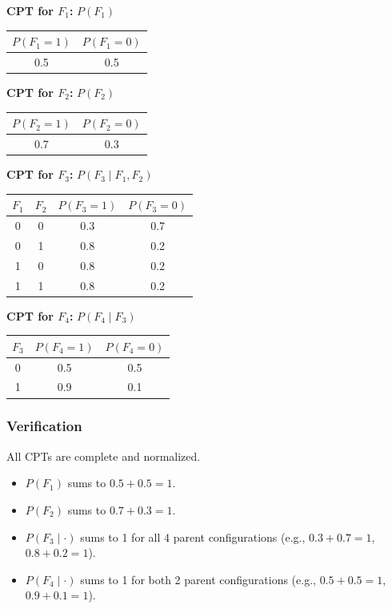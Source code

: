 \documentclass{article}
\begin{document}
\textbf{CPT for $F_1$:} $P(F_1)$
\begin{center}
\begin{tabular}{c c}
\toprule
$P(F_1=1)$ & $P(F_1=0)$ \\
\midrule
0.5 & 0.5 \\
\bottomrule
\end{tabular}
\end{center}

\textbf{CPT for $F_2$:} $P(F_2)$
\begin{center}
\begin{tabular}{c c}
\toprule
$P(F_2=1)$ & $P(F_2=0)$ \\
\midrule
0.7 & 0.3 \\
\bottomrule
\end{tabular}
\end{center}

\textbf{CPT for $F_3$:} $P(F_3 \mid F_1, F_2)$
\begin{center}
\begin{tabular}{c c | c c}
\toprule
$F_1$ & $F_2$ & $P(F_3=1)$ & $P(F_3=0)$ \\
\midrule
0 & 0 & 0.3 & 0.7 \\
0 & 1 & 0.8 & 0.2 \\
1 & 0 & 0.8 & 0.2 \\
1 & 1 & 0.8 & 0.2 \\
\bottomrule
\end{tabular}
\end{center}

\textbf{CPT for $F_4$:} $P(F_4 \mid F_3)$
\begin{center}
\begin{tabular}{c | c c}
\toprule
$F_3$ & $P(F_4=1)$ & $P(F_4=0)$ \\
\midrule
0 & 0.5 & 0.5 \\
1 & 0.9 & 0.1 \\
\bottomrule
\end{tabular}
\end{center}

\subsubsection*{Verification}
All CPTs are complete and normalized.
\begin{itemize}
    \item $P(F_1)$ sums to $0.5 + 0.5 = 1$.
    \item $P(F_2)$ sums to $0.7 + 0.3 = 1$.
    \item $P(F_3 \mid \cdot)$ sums to 1 for all 4 parent configurations (e.g., $0.3+0.7=1$, $0.8+0.2=1$).
    \item $P(F_4 \mid \cdot)$ sums to 1 for both 2 parent configurations (e.g., $0.5+0.5=1$, $0.9+0.1=1$).
\end{itemize}
\end{document}
